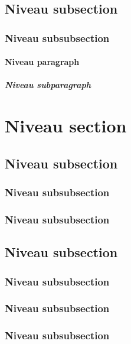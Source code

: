 \documentclass[12pt]{report}
\begin{document}
\subsection{Niveau subsection}

\subsubsection{Niveau subsubsection}

\paragraph{Niveau paragraph}

\subparagraph{Niveau subparagraph}

\section{Niveau section}

\subsection{Niveau subsection}

\subsubsection{Niveau subsubsection}

\subsubsection{Niveau subsubsection}

\subsection{Niveau subsection}

\subsubsection{Niveau subsubsection}

\subsubsection{Niveau subsubsection}

\subsubsection{Niveau subsubsection}
\end{document}
